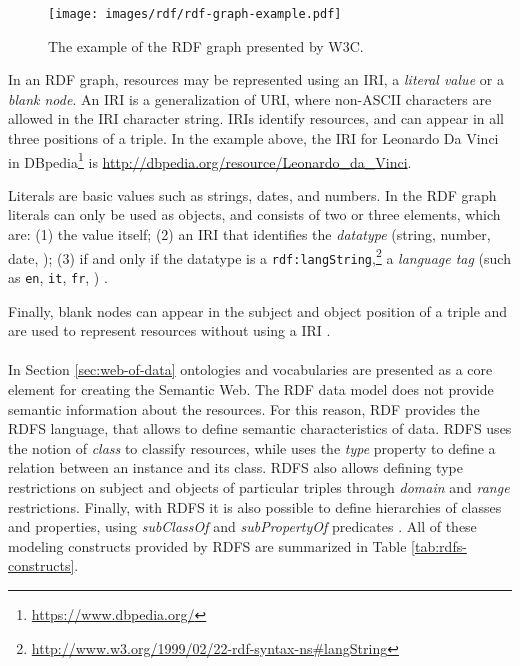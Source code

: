 \begin{figure}[!ht]
    \centering
    \texttt{[image: images/rdf/rdf-graph-example.pdf]}
    \caption{The example of the \ac{RDF} graph presented by \ac{W3C}.}
    \label{fig:rdf-graph-examle}
\end{figure}

In an \ac{RDF} graph, resources may be represented using an \ac{IRI}, a \textit{literal value} or a \textit{blank node}. An \ac{IRI} is a generalization of \ac{URI}, where non-\acs{ASCII} characters are allowed in the \ac{IRI} character string. \acp{IRI} identify resources, and can appear in all three positions of a triple. In the example above, the \ac{IRI} for Leonardo Da Vinci in DBpedia\footnote{\url{https://www.dbpedia.org/}} is \url{http://dbpedia.org/resource/Leonardo_da_Vinci}.

Literals are basic values such as strings, dates, and numbers. In the \ac{RDF} graph literals can only be used as objects, and consists of two or three elements, which are: (1) the value itself; (2) an \ac{IRI} that identifies the \textit{datatype} (string, number, date, \etc); (3) if and only if the datatype is a \texttt{rdf:langString},\footnote{\url{http://www.w3.org/1999/02/22-rdf-syntax-ns\#langString}} a \textit{language tag} (such as \texttt{en}, \texttt{it}, \texttt{fr}, \etc) \cite{world2014rdfconcepts}.

Finally, blank nodes can appear in the subject and object position of a triple and are used to represent resources without using a \ac{IRI} \cite{world2014rdfprimer}.

\paragraph*{}
In Section \ref{sec:web-of-data} ontologies and vocabularies are presented as a core element for creating the Semantic Web. The \ac{RDF} data model does not provide semantic information about the resources. For this reason, \ac{RDF} provides the \ac{RDFS} language, that allows to define semantic characteristics of data. \acl{RDFS} uses the notion of \textit{class} to classify resources, while uses the \textit{type} property to define a relation between an instance and its class. \acl{RDFS} also allows defining type restrictions on subject and objects of particular triples through \textit{domain} and \textit{range} restrictions. Finally, with \acl{RDFS} it is also possible to define hierarchies of classes and properties, using \textit{subClassOf} and \textit{subPropertyOf} predicates \cite{world2014rdfprimer}. All of these modeling constructs provided by \acl{RDFS} are summarized in Table \ref{tab:rdfs-constructs}.

